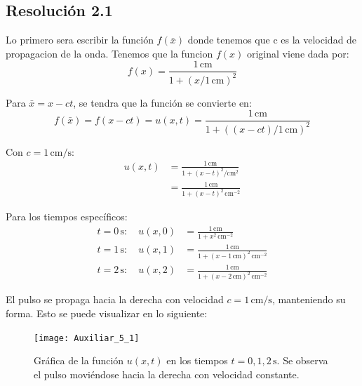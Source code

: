 \documentclass[
  11pt,
  letterpaper,
   addpoints,
   answers
  ]{exam}
\begin{document}
\begin{questions}
\begin{solution}
  \subsection*{Resolución 2.1}
  
Lo primero sera escribir la función $f(\bar{x})$ donde tenemos que c es la velocidad de propagacion de la onda. Tenemos que la funcion $f(x)$ original viene dada por:
  \begin{equation}
    f(x) = \frac{1\,\mathrm{cm}}{1 + \left(x/1\,\mathrm{cm}\right)^2}
  \end{equation}

  Para $\bar{x} = x - ct$, se tendra que la función se convierte en:
  \begin{equation}
    f(\bar{x}) = f(x-ct) = u(x,t) = \frac{1\,\mathrm{cm}}{1 + \left((x-ct)/1\,\mathrm{cm}\right)^2}
  \end{equation}
  
  Con $c = 1\,\mathrm{cm/s}$:
  \begin{align}
    u(x,t) &= \frac{1\,\mathrm{cm}}{1 + (x-t)^2/\mathrm{cm}^2} \\
    &= \frac{1\,\mathrm{cm}}{1 + (x-t)^2\,\mathrm{cm}^{-2}}
  \end{align}
  
  Para los tiempos específicos:
  \begin{align}
    t = 0\,\mathrm{s}: \quad u(x,0) &= \frac{1\,\mathrm{cm}}{1 + x^2\,\mathrm{cm}^{-2}} \\
    t = 1\,\mathrm{s}: \quad u(x,1) &= \frac{1\,\mathrm{cm}}{1 + (x-1\,\mathrm{cm})^2\,\mathrm{cm}^{-2}} \\
    t = 2\,\mathrm{s}: \quad u(x,2) &= \frac{1\,\mathrm{cm}}{1 + (x-2\,\mathrm{cm})^2\,\mathrm{cm}^{-2}}
  \end{align}
  
  El pulso se propaga hacia la derecha con velocidad $c = 1\,\mathrm{cm/s}$, manteniendo su forma. Esto se puede visualizar en lo siguiente:
  \begin{figure}[H]
    \centering
    \texttt{[image: Auxiliar\_5\_1]}
    \caption{Gráfica de la función $u(x,t)$ en los tiempos $t = 0, 1, 2\,\mathrm{s}$. Se observa el pulso moviéndose hacia la derecha con velocidad constante.}
  \end{figure}
  

\end{solution}
\end{questions}
\end{document}
